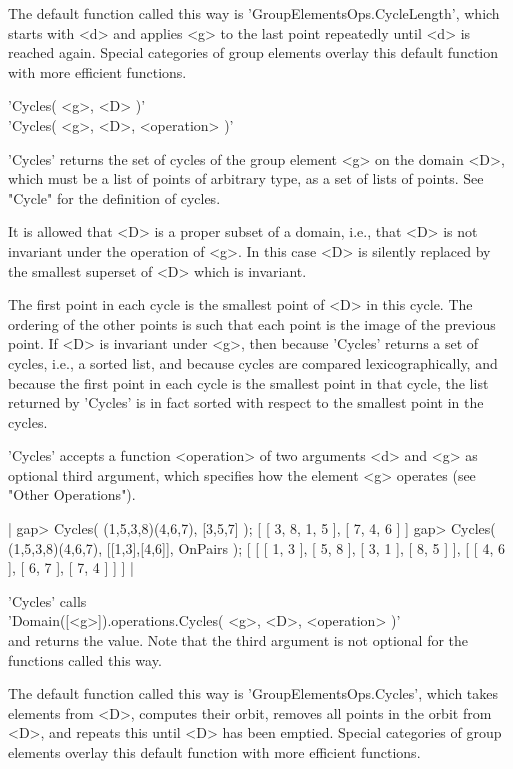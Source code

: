 The default function called  this way  is 'GroupElementsOps.CycleLength',
which starts with <d> and applies <g> to the  last point repeatedly until
<d> is reached again.  Special categories of group  elements overlay this
default function with more efficient functions.


'Cycles( <g>, <D> )' \\
'Cycles( <g>, <D>, <operation> )'

'Cycles' returns the set of cycles of the group element <g> on the domain
<D>, which must be a list of points of arbitrary type,  as a set of lists
of points.  See "Cycle" for the definition of cycles.

It is allowed that <D> is a proper subset of a domain, i.e., that  <D> is
not invariant under the  operation of <g>.   In this case <D> is silently
replaced by the smallest superset of <D> which is invariant.

The first point in each cycle is the smallest point of <D> in this cycle.
The ordering of the other points is such that each  point is the image of
the previous point.  If <D> is invariant under <g>, then because 'Cycles'
returns a set  of cycles,  i.e.,  a sorted list, and  because cycles  are
compared lexicographically, and because the first point in each  cycle is
the smallest  point in that  cycle, the list returned  by  'Cycles' is in
fact sorted with respect to the smallest point in the cycles.

'Cycles' accepts a  function <operation> of two arguments  <d> and <g> as
optional third  argument, which specifies  how  the element  <g> operates
(see "Other Operations").

|    gap> Cycles( (1,5,3,8)(4,6,7), [3,5,7] );
    [ [ 3, 8, 1, 5 ], [ 7, 4, 6 ] ]
    gap> Cycles( (1,5,3,8)(4,6,7), [[1,3],[4,6]], OnPairs );
    [ [ [ 1, 3 ], [ 5, 8 ], [ 3, 1 ], [ 8, 5 ] ],
      [ [ 4, 6 ], [ 6, 7 ], [ 7, 4 ] ] ] |

'Cycles' calls \\
'Domain([<g>]).operations.Cycles( <g>, <D>, <operation> )' \\
and returns the value.  Note that the third  argument is not optional for
the functions called this way.

The default function called this  way is 'GroupElementsOps.Cycles', which
takes elements from <D>, computes their  orbit, removes all points in the
orbit from <D>, and  repeats  this until <D>  has been emptied.   Special
categories  of  group elements  overlay this default  function  with more
efficient functions.

